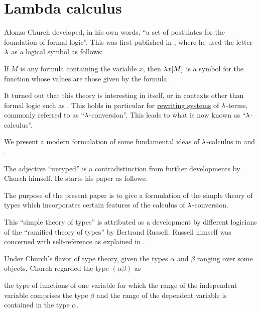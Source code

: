 \chapter{Lambda calculus}\label{ch:lambda_calculus}

Alonzo Church developed, in his own words, \enquote{a set of postulates for the foundation of formal logic}. This was first published in \cite{Church1932Untyped}, where he used the letter \( \mathrm{\lambda} \) as a logical symbol as follows:
\begin{displayquote}
  If \( M \) is any formula containing the variable \( x \), then \( \mathrm{\lambda} x [M] \) is a symbol for the function whose values are those given by the formula.
\end{displayquote}

It turned out that this theory is interesting in itself, or in contexts other than formal logic such as . This holds in particular for \hyperref[def:rewriting_system]{rewriting systems} of \( \mathrm{\lambda} \)-terms, commonly referred to as \enquote{\( \mathrm{\lambda} \)-conversion}. This leads to what is now known as \enquote{\( \mathrm{\lambda} \)-calculus}.

We present a modern formulation of some fundamental ideas of \( \mathrm{\lambda} \)-calculus in  and .

The adjective \enquote{untyped} is a contradistinction from further developments by Church himself. He starts his paper \cite{Church1940STT} as follows:
\begin{displayquote}
  The purpose of the present paper is to give a formulation of the simple theory of types which incorporates certain features of the calculus of \( \mathrm{\lambda} \)-conversion.
\end{displayquote}

This \enquote{simple theory of types} is attributed as a development by different logicians of the \enquote{ramified theory of types} by Bertrand Russell. Russell himself was concerned with self-reference as explained in .

Under Church's flavor of type theory, given the types \( \alpha \) and \( \beta \) ranging over some objects, Church regarded the type \( (\alpha\beta) \) as
\begin{displayquote}
  \textellipsis the type of functions of one variable for which the range of the independent variable comprises the type \( \beta \) and the range of the dependent variable is contained in the type \( \alpha \).
\end{displayquote}

